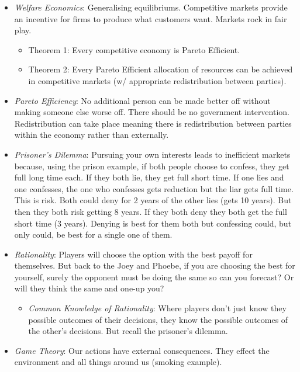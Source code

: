 \documentclass[11pt, english]{article}
\begin{document}
	\begin{itemize}
	\setlength\itemsep{0cm}
		\item \textit{Welfare Economics}: Generalising equilibriums. Competitive markets provide an incentive for firms to produce what customers want. Markets rock in fair play.
		\begin{itemize}
			\item Theorem 1: Every competitive economy is Pareto Efficient.
			\item Theorem 2: Every Pareto Efficient allocation of resources can be achieved in competitive markets (w/ appropriate redistribution between parties).
		\end{itemize}
		\item \textit{Pareto Efficiency}: No additional person can be made better off without making someone else worse off. There should be no government intervention. Redistribution can take place meaning there is redistribution between parties within the economy rather than externally.
		\item \textit{Prisoner's Dilemma}: Pursuing your own interests leads to inefficient markets because, using the prison example, if both people choose to confess, they get full long time each. If they both lie, they get full short time. If one lies and one confesses, the one who confesses gets reduction but the liar gets full time. This is risk. Both could deny for 2 years of the other lies (gets 10 years). But then they both risk getting 8 years. If they both deny they both get the full short time (3 years). Denying is best for them both but confessing could, but only could, be best for a single one of them.
		\item \textit{Rationality}: Players will choose the option with the best payoff for themselves. But back to the Joey and Phoebe, if you are choosing the best for yourself, surely the opponent must be doing the same so can you forecast? Or will they think the same and one-up you?
		\begin{itemize}
			\item \textit{Common Knowledge of Rationality}: Where players don’t just know they possible outcomes of their decisions, they know the possible outcomes of the other’s decisions. But recall the prisoner’s dilemma.
		\end{itemize}
		\item \textit{Game Theory}: Our actions have external consequences. They effect the environment and all things around us (smoking example).
		\begin{itemize}

\end{itemize}
\end{itemize}
\end{document}
